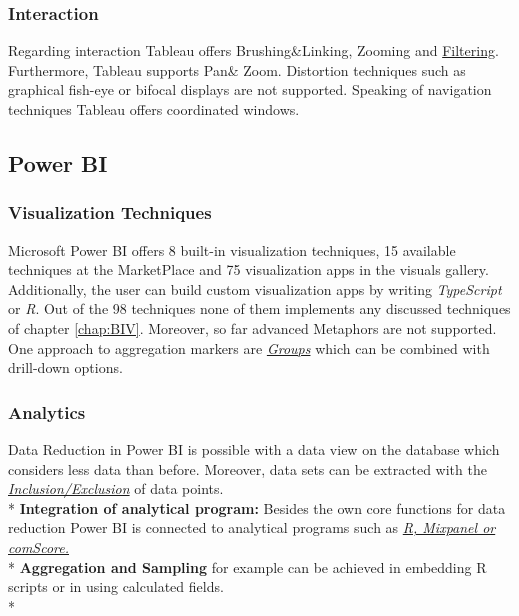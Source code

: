 \subsubsection*{Interaction}
Regarding interaction Tableau offers Brushing\&Linking, Zooming and  \hyperlink{http://kb.tableau.com/articles/howto/adding-filters-to-dashboards}{Filtering}. Furthermore, Tableau supports Pan\& Zoom. 
Distortion techniques such as graphical fish-eye or bifocal displays are not supported. 
Speaking of navigation techniques Tableau offers coordinated windows.

\subsection*{Power BI}

\subsubsection*{Visualization Techniques}
Microsoft Power BI offers 8 built-in visualization techniques, 15 available techniques at the MarketPlace and 75 visualization apps in the visuals gallery. Additionally, the user can build custom visualization apps by writing \textit{TypeScript} or \textit{R}. Out of the 98 techniques none of them implements any discussed techniques of chapter \ref{chap:BIV}. Moreover, so far advanced Metaphors are not supported\cite{Amanda}. One approach to aggregation markers are \hyperlink{https://Power BI.microsoft.com/de-de/blog/power-bi-desktop-october-feature-summary/#grouping}{\textit{Groups}} which can be combined with drill-down options.

\subsubsection*{Analytics}
Data Reduction in Power BI is possible with a data view on the database which considers less data than before. Moreover, data sets can be extracted with the \hyperlink{https://Power BI.microsoft.com/de-de/blog/power-bi-desktop-october-feature-summary/#grouping}{\textit{Inclusion/Exclusion}} of data points.\\*
\textbf{Integration of analytical program:} Besides the own core functions for data reduction Power BI is connected to analytical programs such as \hyperlink{https://Power BI.microsoft.com/de-de/blog/power-bi-desktop-october-feature-summary/#grouping}{\textit{R, Mixpanel or comScore.}}\\*
\textbf{Aggregation and Sampling} for example can be achieved in embedding R scripts or in using calculated fields. \\*
